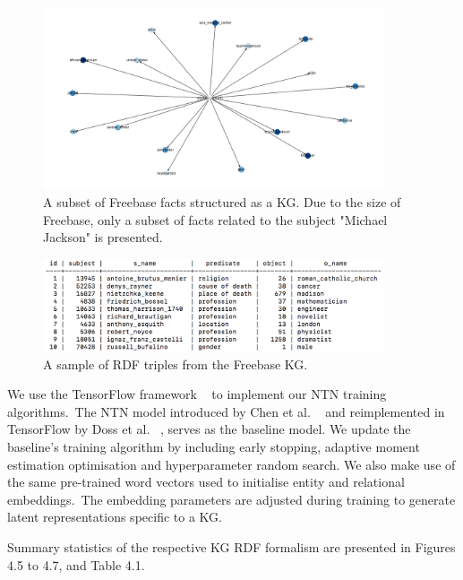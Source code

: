 \begin{figure}[H]
   	\centering
    	\includegraphics[width=0.9\textwidth, height=0.5\textwidth]{Freebase}
	\caption{A subset of Freebase facts structured as a KG. Due to the size of Freebase, only a subset of facts related to the subject "Michael Jackson" is presented.}
\end{figure}

\noindent 

\begin{figure}[H]
   	\centering
    	\includegraphics[width=0.9\textwidth, height=0.2\textwidth]{freebase_fact_sample}
	\caption{A sample of RDF triples from the Freebase KG.}
\end{figure}

\noindent We use the TensorFlow framework \unskip~\citep{abadi2016tensorflow} to implement our NTN training algorithms.\ The NTN model introduced by Chen et al. \unskip ~\citep{socher2013reasoning} and reimplemented in TensorFlow by Doss et al. \unskip ~\citep{Doss2015}, serves as the baseline model. We update the baseline's training algorithm by including early stopping, adaptive moment estimation optimisation and hyperparameter random search. We also make use of the same pre-trained word vectors used to initialise entity and relational embeddings.\ The embedding parameters are adjusted during training to generate latent representations specific to a KG. \par

\noindent Summary statistics of the respective KG RDF formalism are presented in Figures 4.5 to 4.7, and Table 4.1. \par


